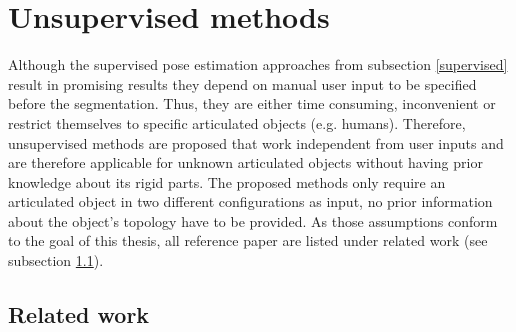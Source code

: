 
\section{Unsupervised methods}
\label{unsupervised}

Although the supervised pose estimation approaches from subsection \ref{supervised} result in promising results they depend on manual user input to be specified before the segmentation. Thus, they are either time consuming, inconvenient or restrict themselves to specific articulated objects (e.g. humans). Therefore, unsupervised methods are proposed that work independent from user inputs and are therefore applicable for unknown articulated objects without having prior knowledge about its rigid parts. The proposed methods only require an articulated object in two different configurations as input, no prior information about the object's topology have to be provided. As those assumptions conform to the goal of this thesis, all reference paper are listed under related work (see subsection \ref{relatedWork}). 
\subsection{Related work}
\label{relatedWork}

